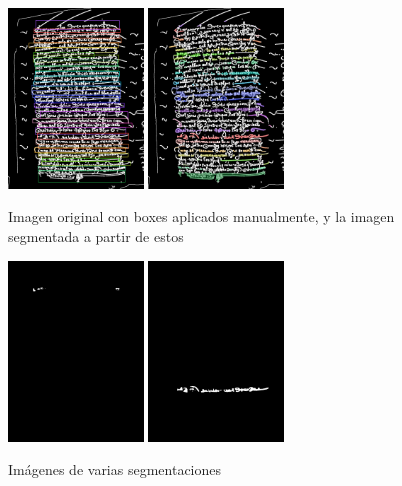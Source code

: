 \documentclass[11pt,a4paper]{article}
\begin{document}
\begin{figure}[H] 
\centering 
\begin{minipage}{1.0\textwidth} 
\includegraphics[width=0.32\textwidth]{source_image.png} 
\includegraphics[width=0.32\textwidth]{segmented_image.png} 
\caption{Imagen original con boxes aplicados manualmente, y la imagen segmentada a partir de estos} 
\label{fig:sam2} 
\end{minipage} 
\end{figure}

\begin{figure}[H] 
\centering 
\begin{minipage}{1.0\textwidth} 
\includegraphics[width=0.32\textwidth]{mask_2.png} 
\includegraphics[width=0.32\textwidth]{mask_22.png} 
\caption{Imágenes de varias segmentaciones} 
\label{fig:sam 2} 
\end{minipage} 
\end{figure}
\end{document}
